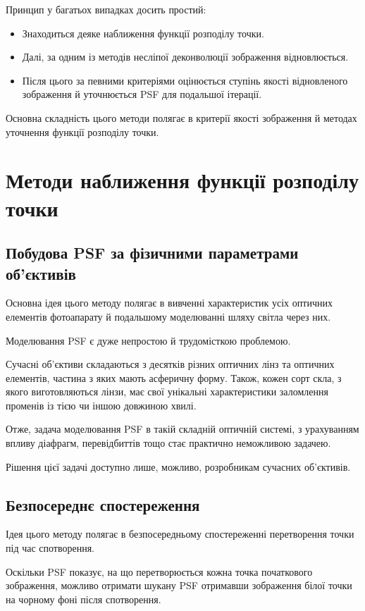 \documentclass{diploma}
\begin{document}
    Принцип у багатьох випадках досить простий:
    \begin{itemize}
      \item Знаходиться деяке наближення функції розподілу точки.
      \item Далі, за одним із методів несліпої деконволюції зображення
        відновлюється.
      \item Після цього за певними критеріями оцінюється ступінь якості
        відновленого зображення й уточнюється PSF для подальшої ітерації.
    \end{itemize}

    Основна складність цього методи полягає в критерії якості зображення й
    методах уточнення функції розподілу точки.
    \clearpage
  \section{Методи наближення функції розподілу точки}
    \subsection{Побудова PSF за фізичними параметрами об’єктивів}
      Основна ідея цього методу полягає в вивченні характеристик усіх оптичних
      елементів фотоапарату й подальшому моделюванні шляху світла через них.

      Моделювання PSF є дуже непростою й трудомісткою проблемою.

      Сучасні об’єктиви складаються з десятків різних оптичних лінз та оптичних
      елементів, частина з яких мають асферичну форму.
      Також, кожен сорт скла, з якого виготовляються лінзи, має свої унікальні
      характеристики заломлення променів із тією чи іншою довжиною хвилі.

      Отже, задача моделювання PSF в такій складній оптичній системі, з
      урахуванням впливу діафрагм, перевідбиттів тощо стає практично неможливою
      задачею.

      Рішення цієї задачі доступно лише, можливо, розробникам сучасних
      об’єктивів.
      \clearpage
    \subsection{Безпосереднє спостереження}
      Ідея цього методу полягає в безпосередньому спостереженні перетворення
      точки під час спотворення.

      Оскільки PSF показує, на що перетворюється кожна точка початкового
      зображення, можливо отримати шукану PSF отримавши зображення білої точки
      на чорному фоні після спотворення.
\end{document}
